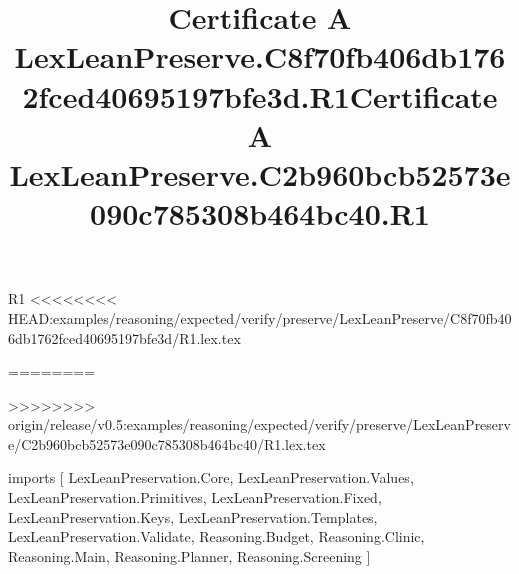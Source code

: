 \begin{lexlean}{R1}
<<<<<<<< HEAD:examples/reasoning/expected/verify/preserve/LexLeanPreserve/C8f70fb406db1762fced40695197bfe3d/R1.lex.tex
\title{Certificate A LexLeanPreserve.C8f70fb406db1762fced40695197bfe3d.R1}
========
\title{Certificate A LexLeanPreserve.C2b960bcb52573e090c785308b464bc40.R1}
>>>>>>>> origin/release/v0.5:examples/reasoning/expected/verify/preserve/LexLeanPreserve/C2b960bcb52573e090c785308b464bc40/R1.lex.tex
\begin{coremodule}
imports [
  LexLeanPreservation.Core,
  LexLeanPreservation.Values,
  LexLeanPreservation.Primitives,
  LexLeanPreservation.Fixed,
  LexLeanPreservation.Keys,
  LexLeanPreservation.Templates,
  LexLeanPreservation.Validate,
  Reasoning.Budget,
  Reasoning.Clinic,
  Reasoning.Main,
  Reasoning.Planner,
  Reasoning.Screening
]


\end{coremodule}
\end{lexlean}
